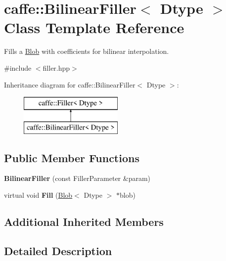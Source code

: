 \hypertarget{classcaffe_1_1BilinearFiller}{}\section{caffe\+:\+:Bilinear\+Filler$<$ Dtype $>$ Class Template Reference}
\label{classcaffe_1_1BilinearFiller}


Fills a \hyperlink{classcaffe_1_1Blob}{Blob} with coefficients for bilinear interpolation.  




{\ttfamily \#include $<$filler.\+hpp$>$}

Inheritance diagram for caffe\+:\+:Bilinear\+Filler$<$ Dtype $>$\+:\begin{figure}[H]
\begin{center}
\leavevmode
\includegraphics[height=2.000000cm]{classcaffe_1_1BilinearFiller}
\end{center}
\end{figure}
\subsection*{Public Member Functions}
\begin{DoxyCompactItemize}
\item 
{\bfseries Bilinear\+Filler} (const Filler\+Parameter \&param)\hypertarget{classcaffe_1_1BilinearFiller_a5052dabfcc0ba4d5e1514d4e397e21b4}{}\label{classcaffe_1_1BilinearFiller_a5052dabfcc0ba4d5e1514d4e397e21b4}

\item 
virtual void {\bfseries Fill} (\hyperlink{classcaffe_1_1Blob}{Blob}$<$ Dtype $>$ $\ast$blob)\hypertarget{classcaffe_1_1BilinearFiller_a53ddc6c22c21476b9411463b3317418a}{}\label{classcaffe_1_1BilinearFiller_a53ddc6c22c21476b9411463b3317418a}

\end{DoxyCompactItemize}
\subsection*{Additional Inherited Members}


\subsection{Detailed Description}

